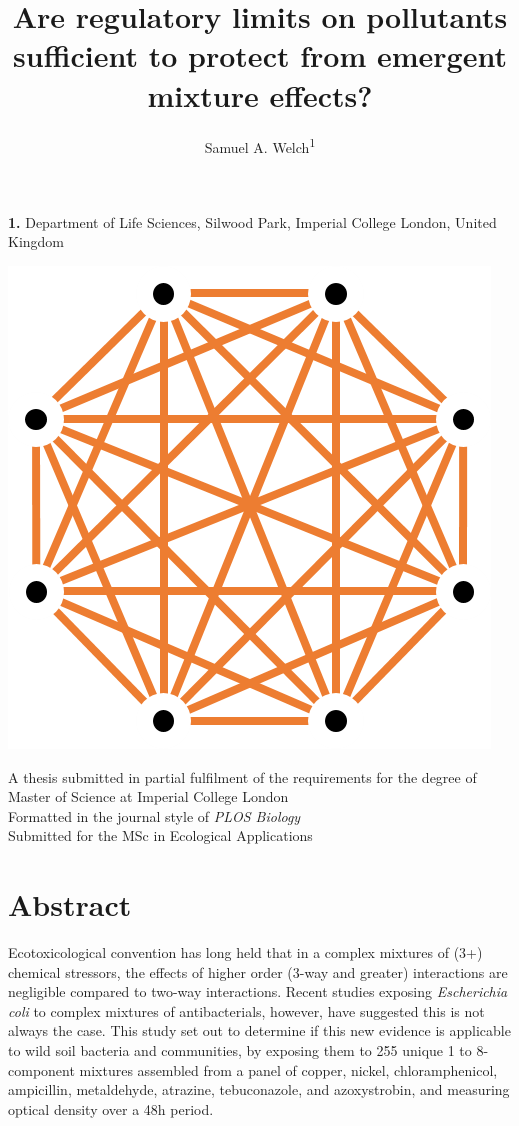 \documentclass[10pt]{article}
\title{\Large{Are regulatory limits on pollutants sufficient to protect from emergent mixture effects?}}
\author{Samuel A. Welch\textsuperscript{1}}
\makeatletter
\renewcommand{\maketitle}{\bgroup\setlength{\parindent}{0pt}
\begin{flushleft}
  \textbf{\@title}

  \@author
\end{flushleft}\egroup
}
\makeatother
\begin{document}
\begin{flushleft}
\maketitle
\bigskip
\textbf{1.} Department of Life Sciences, Silwood Park, Imperial College London, United Kingdom
\bigskip
\end{flushleft}
\vspace{1.0cm}

\begin{center}
\includegraphics[scale = 0.15]{docs/badnews8ways.png}

\vspace{1.0cm}

A thesis submitted in partial fulfilment of the requirements for the degree of Master of Science at Imperial College London\\
\smallskip
Formatted in the journal style of \textit{PLOS Biology}\\
\smallskip
Submitted for the MSc in Ecological Applications
\end{center}

\section*{Abstract}
Ecotoxicological convention has long held that in a complex mixtures of (3+) chemical stressors, the effects of higher order (3-way and greater) interactions are negligible compared to two-way interactions. Recent studies exposing \textit{Escherichia coli} to complex mixtures of antibacterials, however, have suggested this is not always the case. This study set out to determine if this new evidence is applicable to wild soil bacteria and communities, by exposing them to 255 unique 1 to 8-component mixtures assembled from a panel of copper, nickel, chloramphenicol, ampicillin, metaldehyde, atrazine, tebuconazole, and azoxystrobin, and measuring optical density over a 48h period.
\end{document}
